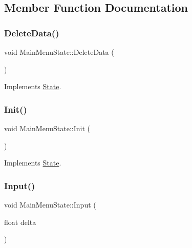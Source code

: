 \subsection{Member Function Documentation}
\mbox{\label{classMainMenuState_a52c4dad229a1e9851e8742b81bc30abb}} 
\subsubsection{\texorpdfstring{Delete\+Data()}{DeleteData()}}
{\footnotesize\ttfamily void Main\+Menu\+State\+::\+Delete\+Data (\begin{DoxyParamCaption}{ }\end{DoxyParamCaption})\hspace{0.3cm}{\ttfamily [virtual]}}



Implements \hyperlink{classState_ade502eaa386d570e526eb356ffd73fd8}{State}.

\mbox{\label{classMainMenuState_afab2a9b829a8ef752fed701d5cd260f8}} 
\subsubsection{\texorpdfstring{Init()}{Init()}}
{\footnotesize\ttfamily void Main\+Menu\+State\+::\+Init (\begin{DoxyParamCaption}{ }\end{DoxyParamCaption})\hspace{0.3cm}{\ttfamily [virtual]}}



Implements \hyperlink{classState_a7ab4d8c6aa239a17ed579d89a209b156}{State}.

\mbox{\label{classMainMenuState_aa62c91d35b5b4a24c0a13c22020845e8}} 
\subsubsection{\texorpdfstring{Input()}{Input()}}
{\footnotesize\ttfamily void Main\+Menu\+State\+::\+Input (\begin{DoxyParamCaption}\item[{float}]{delta }\end{DoxyParamCaption})\hspace{0.3cm}{\ttfamily [virtual]}}



